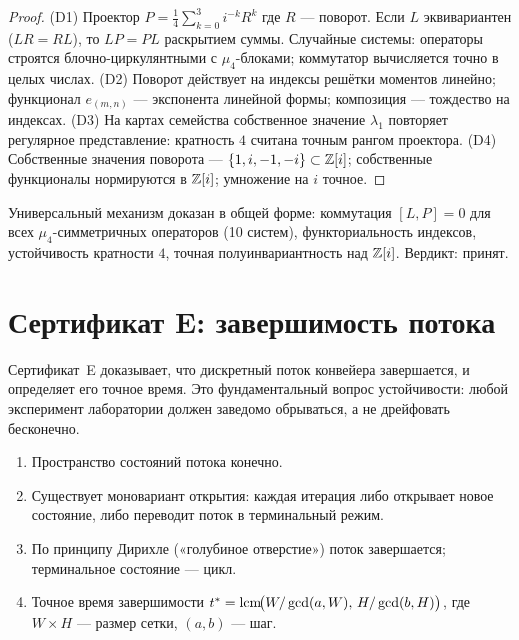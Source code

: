 \begin{proof}
(D1) Проектор $P=\tfrac14\sum_{k=0}^3 i^{-k}R^k$ где $R$ — поворот.
Если $L$ эквивариантен ($LR=RL$), то $LP=PL$ раскрытием суммы.
Случайные системы: операторы строятся блочно-циркулянтными с $\mu_4$-блоками;
коммутатор вычисляется точно в целых числах. (D2) Поворот действует
на индексы решётки моментов линейно; функционал $e_{(m,n)}$ —
экспонента линейной формы; композиция — тождество на индексах.
(D3) На картах семейства собственное значение $\lambda_1$ повторяет
регулярное представление: кратность $4$ считана точным рангом
проектора. (D4) Собственные значения поворота — $\{1,i,-1,-i\}\subset
\mathbb{Z}[i]$; собственные функционалы нормируются в $\mathbb{Z}[i]$; умножение
на $i$ точное.
\end{proof}

\begin{statusbox}[сертификат D]
Универсальный механизм доказан в общей форме: коммутация $[L,P]=0$
для всех $\mu_4$-симметричных операторов (10 систем), функториальность
индексов, устойчивость кратности $4$, точная полуинвариантность над
$\mathbb{Z}[i]$. Вердикт: принят.
\end{statusbox}

\section{Сертификат E: завершимость потока}\label{sec:certE}

Сертификат~E доказывает, что дискретный поток конвейера завершается,
и определяет его точное время. Это фундаментальный вопрос устойчивости:
любой эксперимент лаборатории должен заведомо обрываться, а не
дрейфовать бесконечно.

\begin{theorem}[E1--E4: завершимость]\label{th:E}
\begin{enumerate}[leftmargin=2em, itemsep=0.15em]
\item[(E1)] Пространство состояний потока конечно.
\item[(E2)] Существует моновариант открытия: каждая итерация либо
  открывает новое состояние, либо переводит поток в терминальный
  режим.
\item[(E3)] По принципу Дирихле («голубиное отверстие») поток
  завершается; терминальное состояние — цикл.
\item[(E4)] Точное время завершимости
  $t^*=\operatorname{lcm}\!\bigl(W/\gcd(a,W),\, H/\gcd(b,H)\bigr)$,
  где $W\times H$ — размер сетки, $(a,b)$ — шаг.
\end{enumerate}
\end{theorem}

